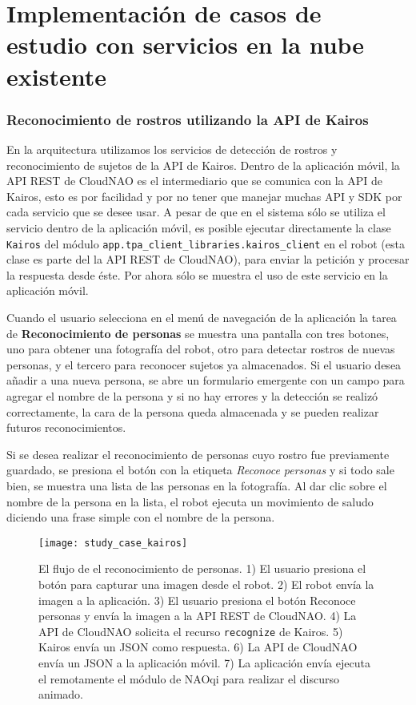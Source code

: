 
\section{Implementación de casos de estudio con servicios en la nube existente}
\label{\detokenize{chapter_two/study_cases_implementation:implementacion-de-casos-de-estudio-con-servicios-en-la-nube-existente}}\label{\detokenize{chapter_two/study_cases_implementation::doc}}


\subsubsection{Reconocimiento de rostros utilizando la API de Kairos}

En la arquitectura utilizamos los servicios de detección de rostros y reconocimiento
de sujetos de la API de Kairos.
Dentro de la aplicación móvil, la API REST de CloudNAO es el intermediario
que se comunica con la API de Kairos, esto es por facilidad y por no
tener que manejar muchas API y SDK por cada servicio que se desee usar.
A pesar de que en el sistema sólo se utiliza el servicio
dentro de la aplicación móvil, es posible ejecutar directamente la clase
\texttt{Kairos} del módulo \texttt{app.tpa\_client\_libraries.kairos\_client}
en el robot (esta clase es parte del la API REST de CloudNAO), para enviar la petición y procesar la respuesta desde éste.
Por ahora sólo se muestra el uso de este servicio en la aplicación móvil.

Cuando el usuario selecciona en el menú de navegación de la aplicación
la tarea de \textbf{Reconocimiento de personas} se muestra una pantalla 
con tres botones, uno para obtener una fotografía del robot, otro para
detectar rostros de nuevas personas, y el tercero para reconocer sujetos
ya almacenados. Si el usuario desea añadir a una nueva persona, se abre un
formulario emergente con un campo para agregar el nombre de la persona y
si no hay errores y la detección se realizó correctamente,
la cara de la persona queda almacenada y se pueden realizar futuros reconocimientos.

Si se desea realizar el reconocimiento de personas cuyo rostro
fue previamente guardado, se presiona el botón con la etiqueta
\textit{Reconoce personas} y si todo sale bien,
se muestra una lista de las personas en la fotografía.
Al dar clic sobre el nombre de la persona en la lista, el robot ejecuta
un movimiento de saludo diciendo una frase simple con el nombre de la persona.

\begin{figure}[!h]
\centering
\caption{El flujo de el reconocimiento de personas. 1) El usuario presiona el botón para capturar una imagen desde el robot. 2) El robot envía la imagen a la 
aplicación. 3) El usuario presiona el botón Reconoce personas y envía la imagen a la API REST de CloudNAO. 4) La API de CloudNAO solicita el recurso \texttt{recognize} de Kairos. 5) Kairos envía un JSON como respuesta. 6) La API 
de CloudNAO envía un JSON a la aplicación móvil. 7) La aplicación envía ejecuta el remotamente el módulo de NAOqi para realizar el discurso animado.}
\texttt{[image: study\_case\_kairos]}
\end{figure}

